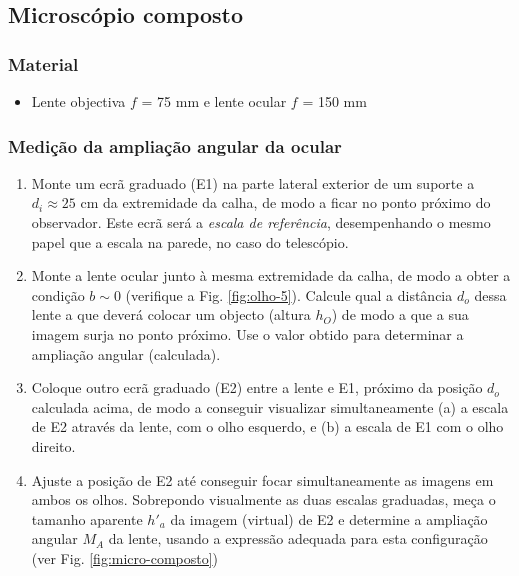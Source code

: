 \documentclass[a4paper,twoside,11pt]{report}      %
\begin{document}

\subsection{\sf Microscópio composto}

\subsubsection*{\sf Material}
\begin{itemize}
\item Lente objectiva $f$ = 75 mm e lente ocular $f$ = 150 mm
\end{itemize}

\subsubsection*{\sf Medição da ampliação angular da ocular}
\begin{enumerate}
\item Monte um ecrã graduado (E1) na parte lateral exterior de um suporte a $d_i\approx 25$ cm da extremidade da calha, de modo a ficar no ponto próximo do observador. Este ecrã será a \emph{escala de referência}, desempenhando o mesmo papel que a escala na parede, no caso do telescópio.
\item Monte a lente ocular junto à mesma extremidade da calha, de modo a obter a condição $b\sim 0$ (verifique a Fig. \ref{fig:olho-5}). Calcule qual a distância $d_o$ dessa lente a que deverá colocar um objecto (altura $h_O$) de modo a que a sua imagem surja no ponto próximo. Use o valor obtido para determinar a ampliação angular (calculada).
\item Coloque outro ecrã graduado (E2) entre a lente e E1, próximo da posição $d_o$ calculada acima, de modo a conseguir visualizar simultaneamente (a) a escala de E2 através da lente, com o olho esquerdo, e (b) a escala de E1 com o olho direito.
\item Ajuste a posição de E2 até conseguir focar simultaneamente as imagens em ambos os olhos. Sobrepondo visualmente as duas escalas graduadas, meça o tamanho aparente $h'_a$ da imagem (virtual) de E2 e determine a ampliação angular $M_A$ da lente, usando a expressão adequada para esta configuração (ver Fig. \ref{fig:micro-composto})
\end{enumerate}
\end{document}
